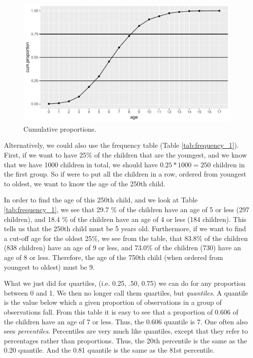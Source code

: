 \documentclass[]{report}\usepackage[]{graphicx}\usepackage[]{color}
\makeatletter
\def\maxwidth{ %
  \ifdim\Gin@nat@width>\linewidth
    \linewidth
  \else
    \Gin@nat@width
  \fi
}
\makeatother
\begin{document}
\begin{figure}

{\centering \includegraphics[width=\maxwidth]{figure/quartile_2-1} 

}

\caption[Cumulative proportions]{Cumulative proportions.}\label{fig:quartile_2}
\end{figure}




Alternatively, we could also use the frequency table (Table \ref{tab:frequency_1}). First, if we want to have 25\% of the children that are the youngest, and we know that we have 1000 children in total, we should have $0.25 * 1000=250$ children in the first group. So if were to put all the children in a row, ordered from youngest to oldest, we want to know the age of the 250th child. 

In order to find the age of this 250th child, and we look at Table \ref{tab:frequency_1}, we see that 29.7 \% of the children have an age of 5 or less (297 children), and 18.4 \% of the children have an age of 4 or less (184 children). This tells us that the 250th child must be 5 years old. Furthermore, if we want to find a cut-off age for the oldest 25\%, we see from the table, that 83.8\% of the children (838 children) have an age of 9 or less, and 73.0\% of the children (730) have an age of 8 or less. Therefore, the age of the 750th child (when ordered from youngest to oldest) must be 9. 


What we just did for quartiles, (i.e. 0.25, .50, 0.75) we can do for any proportion between 0 and 1. We then no longer call them quartiles, but \textit{quantiles}. A quantile is the value below which a given proportion of observations in a group of observations fall. From this table it is easy to see that a proportion of 0.606 of the children have an age of 7 or less. Thus, the 0.606 quantile is 7. One often also sees \textit{percentiles}. Percentiles are very much like quantiles, except that they refer to percentages rather than proportions. Thus, the 20th percentile is the same as the 0.20 quantile. And the 0.81 quantile is the same as the 81st percentile. 
\end{document}
